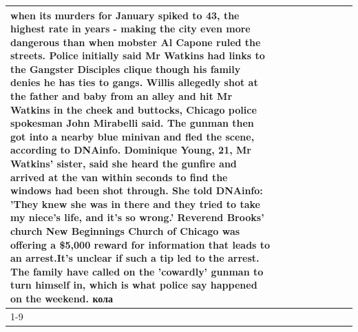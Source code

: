 \begin{table}[H]
\begin{tabular}{lllrlllll}
when its murders for January spiked to 43, the highest rate in years - making the city even more dangerous than when mobster Al Capone ruled the streets. Police initially said Mr Watkins had links to the Gangster Disciples clique though his family denies he has ties to gangs. Willis allegedly shot at the father and baby from an alley and hit Mr Watkins in the cheek and buttocks, Chicago police spokesman John Mirabelli said. The gunman then got into a nearby blue minivan and fled the scene, according to DNAinfo. Dominique Young, 21, Mr Watkins' sister, said she heard the gunfire and arrived at the van within seconds to find the windows had been shot through. She told DNAinfo: 'They knew she was in there and they tried to take my niece's life, and it's so wrong.' Reverend Brooks' church New Beginnings Church of Chicago was offering a \$5,000 reward for information that leads to an arrest.It's unclear if such a tip led to the arrest. The family have called on the 'cowardly' gunman to turn himself in, which is what police say happened on the weekend. кола \\
\cline{1-9}

\end{tabular}
\end{table}
